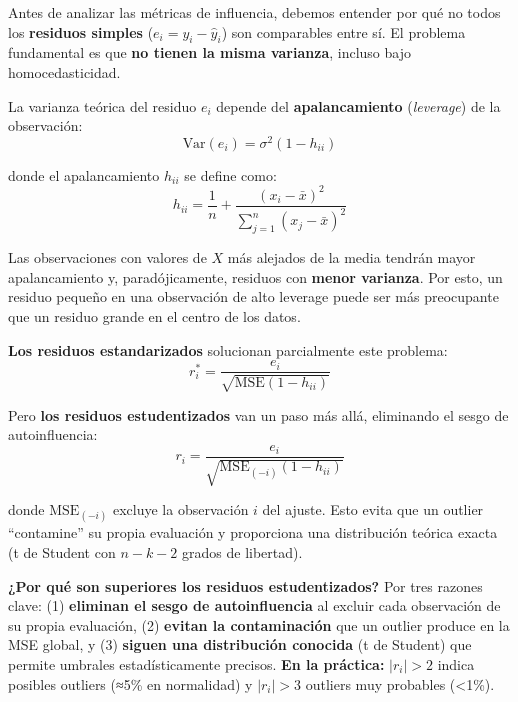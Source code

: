 \documentclass[
  letterpaper,
  DIV=11,
  numbers=noendperiod]{scrreprt}
\begin{document}
\begin{tcolorbox}[enhanced jigsaw, leftrule=.75mm, breakable, colbacktitle=quarto-callout-note-color!10!white, bottomrule=.15mm, colframe=quarto-callout-note-color-frame, toprule=.15mm, colback=white, coltitle=black, bottomtitle=1mm, left=2mm, title=\textcolor{quarto-callout-note-color}{\faInfo}\hspace{0.5em}{Fundamento teórico: de los residuos simples a los estudentizados}, opacityback=0, arc=.35mm, opacitybacktitle=0.6, toptitle=1mm, titlerule=0mm, rightrule=.15mm]

Antes de analizar las métricas de influencia, debemos entender por qué
no todos los \textbf{residuos simples} (\(e_i = y_i - \hat{y}_i\)) son
comparables entre sí. El problema fundamental es que \textbf{no tienen
la misma varianza}, incluso bajo homocedasticidad.

La varianza teórica del residuo \(e_i\) depende del
\textbf{apalancamiento} (\emph{leverage}) de la observación: \[
\text{Var}(e_i) = \sigma^2(1 - h_{ii})
\]

donde el apalancamiento \(h_{ii}\) se define como: \[
h_{ii} = \frac{1}{n} + \frac{(x_i - \bar{x})^2}{\sum_{j=1}^{n}(x_j - \bar{x})^2}
\]

Las observaciones con valores de \(X\) más alejados de la media tendrán
mayor apalancamiento y, paradójicamente, residuos con \textbf{menor
varianza}. Por esto, un residuo pequeño en una observación de alto
leverage puede ser más preocupante que un residuo grande en el centro de
los datos.

\textbf{Los residuos estandarizados} solucionan parcialmente este
problema: \[
r_i^* = \frac{e_i}{\sqrt{\text{MSE}(1 - h_{ii})}}
\]

Pero \textbf{los residuos estudentizados} van un paso más allá,
eliminando el sesgo de autoinfluencia: \[
r_i = \frac{e_i}{\sqrt{\text{MSE}_{(-i)}(1 - h_{ii})}}
\]

donde \(\text{MSE}_{(-i)}\) excluye la observación \(i\) del ajuste.
Esto evita que un outlier ``contamine'' su propia evaluación y
proporciona una distribución teórica exacta (t de Student con \(n-k-2\)
grados de libertad).

\textbf{¿Por qué son superiores los residuos estudentizados?} Por tres
razones clave: (1) \textbf{eliminan el sesgo de autoinfluencia} al
excluir cada observación de su propia evaluación, (2) \textbf{evitan la
contaminación} que un outlier produce en la MSE global, y (3)
\textbf{siguen una distribución conocida} (t de Student) que permite
umbrales estadísticamente precisos. \textbf{En la práctica:}
\(|r_i| > 2\) indica posibles outliers (≈5\% en normalidad) y
\(|r_i| > 3\) outliers muy probables (\textless1\%).

\end{tcolorbox}
\end{document}

